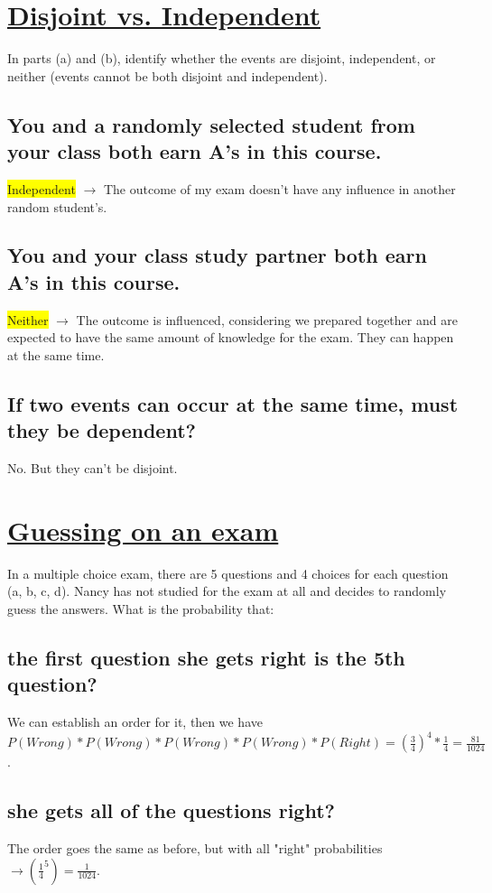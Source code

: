 \documentclass[11pt]{article}
\begin{document}
\section{\underline{Disjoint vs. Independent}}
\label{sec:org4e74d27}
In parts (a) and (b), identify whether the events are disjoint, independent, or neither (events cannot be both disjoint and independent).
\subsection{You and a randomly selected student from your class both earn A's in this course.}
\label{sec:org13c333b}
\colorbox{yellow}{Independent} \(\to\) The outcome of my exam doesn't have any influence in another random student's.
\subsection{You and your class study partner both earn A's in this course.}
\label{sec:orgb5a3111}
\colorbox{yellow}{Neither} \(\to\) The outcome is influenced, considering we prepared together and are expected to have the same amount of knowledge for the exam. They can happen at the same time.
\subsection{If two events can occur at the same time, must they be dependent?}
\label{sec:org1e3a018}
No. But they can't be disjoint.
\section{\underline{Guessing on an exam}}
\label{sec:org17e3728}
In a multiple choice exam, there are 5 questions and 4 choices for each question (a, b, c, d). Nancy has not studied for the exam at all and decides to randomly guess the answers. What is the probability that:
\subsection{the first question she gets right is the 5th question?}
\label{sec:orgfad3bde}
We can establish an order for it, then we have \(P(Wrong) * P(Wrong) * P(Wrong) * P(Wrong) * P(Right) = (\frac{3}{4})^4 * \frac{1}{4} = \frac{81}{1024}\).
\subsection{she gets all of the questions right?}
\label{sec:org28c758d}
The order goes the same as before, but with all "right" probabilities \(\to (\frac{1}{4}^5) = \frac{1}{1024}\).
\end{document}
